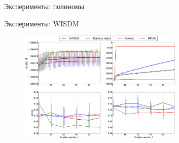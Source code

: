 \documentclass[10pt,pdf,utf8,russian,aspectratio=169]{beamer}
\begin{document}
\begin{frame}{Эксперименты: полиномы}
\begin{figure}
  \centering
\label{fig:1}\qquad

\end{figure}
\end{frame}

\begin{frame}{Эксперименты: WISDM}
\begin{figure}  
\includegraphics[width=0.7\textwidth]{Fig_wisdm.eps}
\end{figure}
\end{frame}
\end{document}
